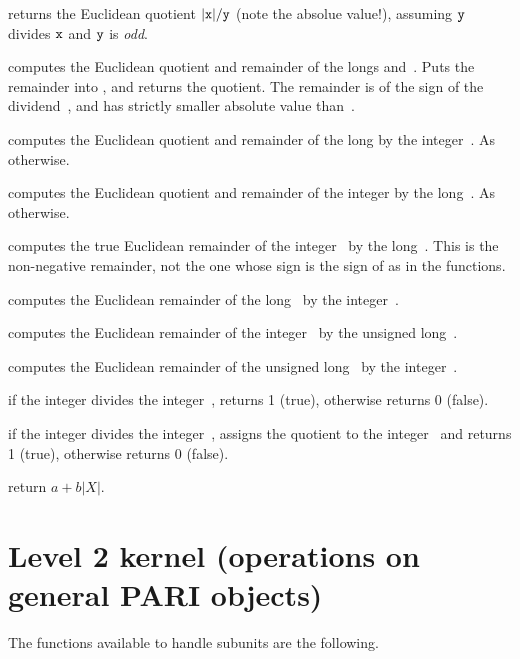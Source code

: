  returns the Euclidean quotient
$|{\tt x}| / {\tt y}$ (note the absolue value!), assuming ${\tt y}$ divides
${\tt x}$ and ${\tt y}$ is \emph{odd}.

 computes the Euclidean
quotient and remainder of the longs  and~. Puts the remainder
into , and returns the quotient. The remainder is of the sign of the
dividend~, and has strictly smaller absolute value than~.

 computes the Euclidean
quotient and remainder of the long  by the integer~. As
 otherwise.

 computes the Euclidean quotient
and remainder of the integer  by the long~. As
 otherwise.

 computes the true Euclidean
remainder of the integer~ by the long~. This is the
non-negative remainder, not the one whose sign is the sign of 
as in the  functions.

 computes the Euclidean
remainder of the long~ by the integer~.

 computes the Euclidean
remainder of the integer~ by the unsigned long~.

 computes the Euclidean
remainder of the unsigned long~ by the integer~.


 if the integer  divides the
integer~, returns 1 (true), otherwise returns 0 (false).

 if the integer  divides the
integer~, assigns the quotient to the integer~ and returns 1
(true), otherwise returns 0 (false).

 return $a + b|X|$.

\section{Level 2 kernel (operations on general PARI objects)}

\noindent The functions available to handle subunits are the following.


